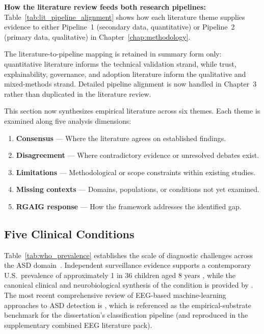\vspace{1em}
\noindent\textbf{How the literature review feeds both research pipelines:} Table~\ref{tab:lit_pipeline_alignment} shows how each literature theme supplies evidence to either Pipeline~1 (secondary data, quantitative) or Pipeline~2 (primary data, qualitative) in Chapter~\ref{chap:methodology}.

The literature-to-pipeline mapping is retained in summary form only: quantitative literature informs the technical validation strand, while trust, explainability, governance, and adoption literature inform the qualitative and mixed-methods strand. Detailed pipeline alignment is now handled in Chapter~3 rather than duplicated in the literature review.


\vspace{1em}
This section now synthesizes empirical literature across six themes. Each theme is examined along five analysis dimensions:

\begin{enumerate}[leftmargin=*, itemsep=2pt]
  \item \textbf{Consensus} --- Where the literature agrees on established findings.
  \item \textbf{Disagreement} --- Where contradictory evidence or unresolved debates exist.
  \item \textbf{Limitations} --- Methodological or scope constraints within existing studies.
  \item \textbf{Missing contexts} --- Domains, populations, or conditions not yet examined.
  \item \textbf{RGAIG response} --- How the framework addresses the identified gap.
\end{enumerate}

\subsection{Five Clinical Conditions}

Table~\ref{tab:who_prevalence} establishes the scale of diagnostic challenges across the ASD domain~\cite{who2024neuro}. Independent surveillance evidence supports a contemporary U.S.\ prevalence of approximately 1 in 36 children aged 8 years \cite{maenner2023prevalence}, while the canonical clinical and neurobiological synthesis of the condition is provided by \cite{lord2020asd}. The most recent comprehensive review of EEG-based machine-learning approaches to ASD detection is \cite{khare2023asdeeg}, which is referenced as the empirical-substrate benchmark for the dissertation's classification pipeline (and reproduced in the supplementary combined EEG literature pack).

